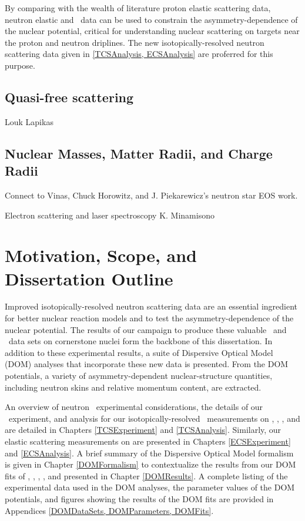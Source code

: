 By comparing with the wealth of literature proton elastic scattering data, neutron elastic and \tot\ data
can be used to constrain the asymmetry-dependence of the nuclear potential, critical for
understanding nuclear scattering on targets near the proton and neutron driplines. The new
isotopically-resolved neutron scattering data given in \ref{TCSAnalysis, ECSAnalysis} are proferred
for this purpose.

\subsection{Quasi-free scattering}
Louk Lapikas

\subsection{Nuclear Masses, Matter Radii, and Charge Radii}
Connect to Vinas, Chuck Horowitz, and J. Piekarewicz's neutron star EOS work.

Electron scattering and laser spectroscopy
K. Minamisono

\section{Motivation, Scope, and Dissertation Outline}
Improved isotopically-resolved neutron scattering data are an essential ingredient
for better nuclear reaction models and to test the asymmetry-dependence of the
nuclear potential. The results of our campaign to produce these valuable
\tot\ and \el\ data sets on cornerstone nuclei form the backbone of this dissertation.
In addition to these experimental results, a suite of Dispersive Optical Model (DOM) analyses that 
incorporate these new data is presented. From the DOM potentials, a variety of asymmetry-dependent 
nuclear-structure quantities, including neutron skins and relative momentum
content, are extracted.

An overview of neutron \tot\ experimental considerations, the details of our 
\tot\ experiment, and analysis for our isotopically-resolved \tot\ measurements
on \oSixEight, \niEightFour, \rhThree, and \snTwelveFour are detailed in 
Chapters \ref{TCSExperiment} and \ref{TCSAnalysis}. Similarly, our elastic scattering measurements 
on \snTwelveFour are presented in Chapters \ref{ECSExperiment} and \ref{ECSAnalysis}. A brief 
summary of the Dispersive Optical Model formalism is
given in Chapter \ref{DOMFormalism} to contextualize the results from our DOM fits of \oSixEight, 
\caAughtEight, \niEightFour, \snTwelveFour, and \pbEight presented in Chapter \ref{DOMResults}. 
A complete listing of the experimental data used in the DOM analyses, the
parameter values of the DOM potentials, and figures showing the 
results of the DOM fits are provided in Appendices \ref{DOMDataSets,
DOMParameters, DOMFits}. 
